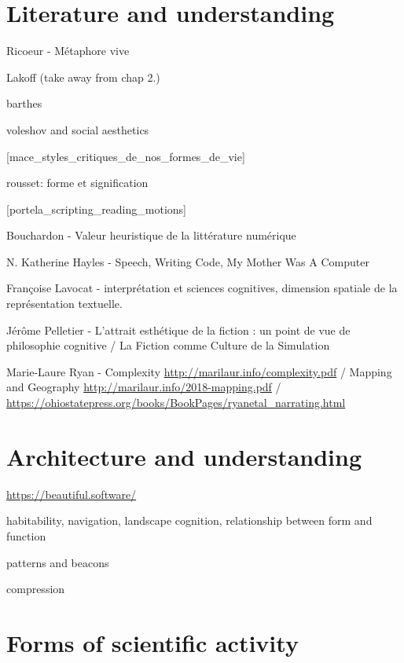 \section{Literature and understanding}
\label{sec:aesthetic-literature}


Ricoeur - Métaphore vive

Lakoff (take away from chap 2.)

barthes 

voleshov and social aesthetics

[mace_styles_critiques_de_nos_formes_de_vie]

rousset: forme et signification

[portela_scripting_reading_motions]


Bouchardon - Valeur heuristique de la littérature numérique

N. Katherine Hayles - Speech, Writing Code, My Mother Was A Computer


Françoise Lavocat - interprétation et sciences cognitives, dimension spatiale de la représentation textuelle.

Jérôme Pelletier -  L'attrait esthétique de la fiction : un point de vue de philosophie cognitive /  La Fiction comme Culture de la Simulation 

Marie-Laure Ryan - Complexity \url{http://marilaur.info/complexity.pdf} / Mapping and Geography \url{http://marilaur.info/2018-mapping.pdf} / \url{https://ohiostatepress.org/books/BookPages/ryanetal_narrating.html}

\section{Architecture and understanding}
\label{sec:arch-understanding}


\url{https://beautiful.software/}

habitability, navigation, landscape cognition, relationship between form and function

patterns and beacons

compression

\section{Forms of scientific activity}
\label{sec:aesthetic-mathematics}


